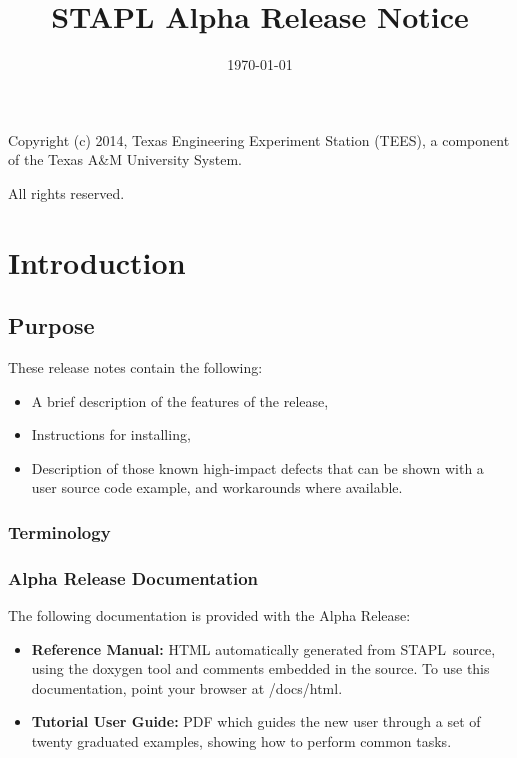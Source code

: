 \documentclass{report}
\begin{document}
\title{STAPL Alpha Release Notice}
\date{\today}
\maketitle

\newcommand{\stapl}{{\sc STAPL}}


\vspace*{8cm}
\begin{center}
Copyright (c) 2014, Texas Engineering Experiment Station (TEES), a
component of the Texas A\&M University System.

All rights reserved.
\end{center}
\pagebreak


\chapter{Introduction}

\section{Purpose}

These release notes contain the following:
\begin{itemize}
\item
A brief description of the features of the release,
\item
Instructions for installing,
\item
Description of those known high-impact defects that can be shown 
with a user source code example, and workarounds where available.
\end{itemize}

\subsection{Terminology}

\subsection{Alpha Release Documentation}

The following documentation is provided with the Alpha Release:

\begin{itemize}
\item
{\bf Reference Manual:} HTML automatically generated from \stapl\ source,
using the doxygen tool and comments embedded in the source.
To use this documentation, point your browser at /docs/html.
\item
{\bf Tutorial User Guide:} PDF which guides the new user through a set
of twenty graduated examples, showing how to perform common tasks.
\end{itemize}
\end{document}
